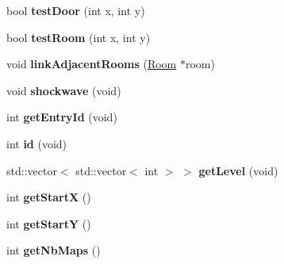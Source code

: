 \begin{DoxyCompactItemize}
\item 
\hypertarget{class_level_generator_aa8297433f2d818a0e1839faf9c899f4d}{bool {\bfseries test\+Door} (int x, int y)}\label{class_level_generator_aa8297433f2d818a0e1839faf9c899f4d}

\item 
\hypertarget{class_level_generator_a4ea22d65b574c874fdf8d1480dfb7ceb}{bool {\bfseries test\+Room} (int x, int y)}\label{class_level_generator_a4ea22d65b574c874fdf8d1480dfb7ceb}

\item 
\hypertarget{class_level_generator_aaaccd1f1c3b4331d30ba5a56b3d027f8}{void {\bfseries link\+Adjacent\+Rooms} (\hyperlink{class_room}{Room} $\ast$room)}\label{class_level_generator_aaaccd1f1c3b4331d30ba5a56b3d027f8}

\item 
\hypertarget{class_level_generator_ae7e5462d7434108c2ef3ae9c217a29c8}{void {\bfseries shockwave} (void)}\label{class_level_generator_ae7e5462d7434108c2ef3ae9c217a29c8}

\item 
\hypertarget{class_level_generator_a4a54eac0ab907095552548bf67a5aa55}{int {\bfseries get\+Entry\+Id} (void)}\label{class_level_generator_a4a54eac0ab907095552548bf67a5aa55}

\item 
\hypertarget{class_level_generator_af415fc7e70da9af9d8b3cae64988e3db}{int {\bfseries id} (void)}\label{class_level_generator_af415fc7e70da9af9d8b3cae64988e3db}

\item 
\hypertarget{class_level_generator_a2a1aaa623b0fbb7c08a37b233bc0eddc}{std\+::vector$<$ std\+::vector$<$ int $>$ $>$ {\bfseries get\+Level} (void)}\label{class_level_generator_a2a1aaa623b0fbb7c08a37b233bc0eddc}

\item 
\hypertarget{class_level_generator_adc1012bf21a7bff0887cc3e74b8f18f1}{int {\bfseries get\+Start\+X} ()}\label{class_level_generator_adc1012bf21a7bff0887cc3e74b8f18f1}

\item 
\hypertarget{class_level_generator_a2724eb94a1f8a3c2cb96d284eddeab0f}{int {\bfseries get\+Start\+Y} ()}\label{class_level_generator_a2724eb94a1f8a3c2cb96d284eddeab0f}

\item 
\hypertarget{class_level_generator_ae198cc8f678e6bb3f51932099dc5f6c9}{int {\bfseries get\+Nb\+Maps} ()}\label{class_level_generator_ae198cc8f678e6bb3f51932099dc5f6c9}

\end{DoxyCompactItemize}
